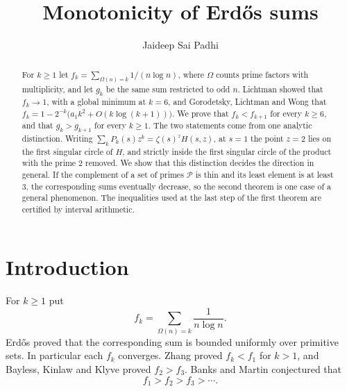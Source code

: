 \documentclass[11pt]{amsart}
\theoremstyle{plain}
\theoremstyle{definition}
\begin{document}
\title{Monotonicity of Erd\H{o}s sums}
\author{Jaideep Sai Padhi}
\address{Department of Computer Science, Purdue University,
West Lafayette, IN 47907, USA}
\date{}

\begin{abstract}
For $k\geq1$ let $f_k=\sum_{\Omega(n)=k}1/(n\log n)$, where $\Omega$ counts
prime factors with multiplicity, and let $g_k$ be the same sum restricted to
odd $n$. Lichtman showed that $f_k\to1$, with a global minimum at $k=6$, and
Gorodetsky, Lichtman and Wong that
$f_k=1-2^{-k}\bigl(a_1k^2+O(k\log(k+1))\bigr)$. We prove that $f_k<f_{k+1}$
for every $k\geq6$, and that $g_k>g_{k+1}$ for every $k\geq1$. The two
statements come from one analytic distinction. Writing
$\sum_kP_k(s)z^k=\zeta(s)^zH(s,z)$, at $s=1$ the point $z=2$ lies on the first
singular circle of $H$, and strictly inside the first singular circle of the
product with the prime $2$ removed. We show that this distinction decides the
direction in general. If the complement of a set of primes $\mathcal P$ is
thin and its least element is at least $3$, the corresponding sums eventually
decrease, so the second theorem is one case of a general phenomenon. The
inequalities used at the last step of the first
theorem are certified by interval arithmetic.
\end{abstract}

\maketitle

\section{Introduction}

For $k\geq1$ put
\[
  f_k=\sum_{\Omega(n)=k}\frac1{n\log n}.
\]
Erd\H{o}s \cite{Erdos} proved that the corresponding sum is bounded uniformly
over primitive sets. In particular each $f_k$ converges. Zhang \cite{Zhang}
proved $f_k<f_1$ for $k>1$, and Bayless, Kinlaw and Klyve \cite{BKK} proved
$f_2>f_3$. Banks and Martin \cite{BanksMartin} conjectured that
\begin{equation}\label{eq:BM}
  f_1>f_2>f_3>\cdots.
\end{equation}
\end{document}
